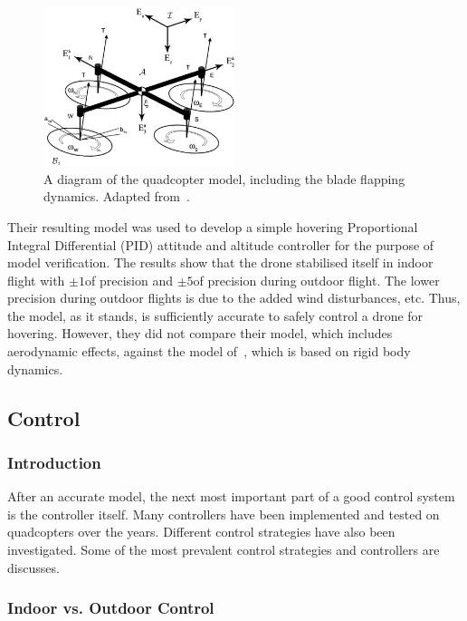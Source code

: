 \begin{figure}
  \centering
  \includegraphics[width=0.5\textwidth]{figures/chapter2/pounds_quad-model.jpg}
  \caption[A diagram of the quadcopter model, including the blade flapping dynamics.]{A diagram of the quadcopter model, including the blade flapping dynamics. Adapted from~\cite{Pounds2010c}.}
\label{fig:chap2-quad-model}
\end{figure}

Their resulting model was used to develop a simple hovering Proportional Integral Differential (PID) attitude and altitude controller for the purpose of model verification. The results show that the drone stabilised itself in indoor flight with $\pm1$\textdegree of precision and $\pm5$\textdegree of precision during outdoor flight. The lower precision during outdoor flights is due to the added wind disturbances, etc. Thus, the model, as it stands, is sufficiently accurate to safely control a drone for hovering. However, they did not compare their model, which includes aerodynamic effects, against the model of~\citeauthor{hamel2002dynamic}, which is based on rigid body dynamics. 

\subsection{Control}

\subsubsection{Introduction}

After an accurate model, the next most important part of a good control system is the controller itself. Many controllers have been implemented and tested on quadcopters over the years. Different control strategies have also been investigated. Some of the most prevalent control strategies and controllers are discusses.

\subsubsection{Indoor vs. Outdoor Control}

